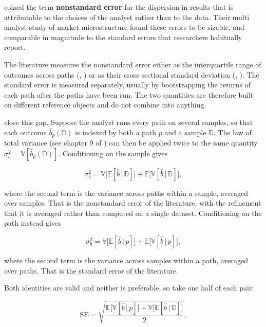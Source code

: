 \cite{menkveld2021standard} coined the term \textbf{nonstandard error} for the dispersion in results that is attributable to the choices of the analyst rather than to the data. Their multi analyst study of market microstructure found these errors to be sizable, and comparable in magnitude to the standard errors that researchers habitually report.

The literature measures the nonstandard error either as the interquartile range of outcomes across paths (\cite{menkveld2021standard}, \cite{walter2022non}) or as their cross sectional standard deviation (\cite{soebhag2022mind}, \cite{fieberg2024non}). The standard error is measured separately, usually by bootstrapping the returns of each path after the paths have been run. The two quantities are therefore built on different reference objects and do not combine into anything.

\cite{coqueret2026persistent} close this gap. Suppose the analyst runs every path on several samples, so that each outcome $\hat{b}_p(\mathbb{D})$ is indexed by both a path $p$ and a sample $\mathbb{D}$. The law of total variance (see chapter 9 of \cite{blitzstein2019introduction}) can then be applied twice to the same quantity $\sigma_b^2 = \mathbb{V}[\hat{b}_p(\mathbb{D})]$. Conditioning on the sample gives

\begin{equation}
\label{eq_design_ltv_sample}
\sigma_b^2 = \mathbb{V}\big[\mathbb{E}[\hat{b}\,|\,\mathbb{D}]\big] + \mathbb{E}\big[\mathbb{V}[\hat{b}\,|\,\mathbb{D}]\big],
\end{equation}

where the second term is the variance across paths within a sample, averaged over samples. That is the nonstandard error of the literature, with the refinement that it is averaged rather than computed on a single dataset. Conditioning on the path instead gives

\begin{equation}
\label{eq_design_ltv_path}
\sigma_b^2 = \mathbb{V}\big[\mathbb{E}[\hat{b}\,|\,p]\big] + \mathbb{E}\big[\mathbb{V}[\hat{b}\,|\,p]\big],
\end{equation}

where the second term is the variance across samples within a path, averaged over paths. That is the standard error of the literature.

Both identities are valid and neither is preferable, so \cite{coqueret2026persistent} take one half of each pair:

\begin{equation}
\label{eq_design_se}
\text{SE} = \sqrt{\frac{\mathbb{E}\big[\mathbb{V}[\hat{b}\,|\,p]\big] + \mathbb{V}\big[\mathbb{E}[\hat{b}\,|\,\mathbb{D}]\big]}{2}},
\end{equation}


